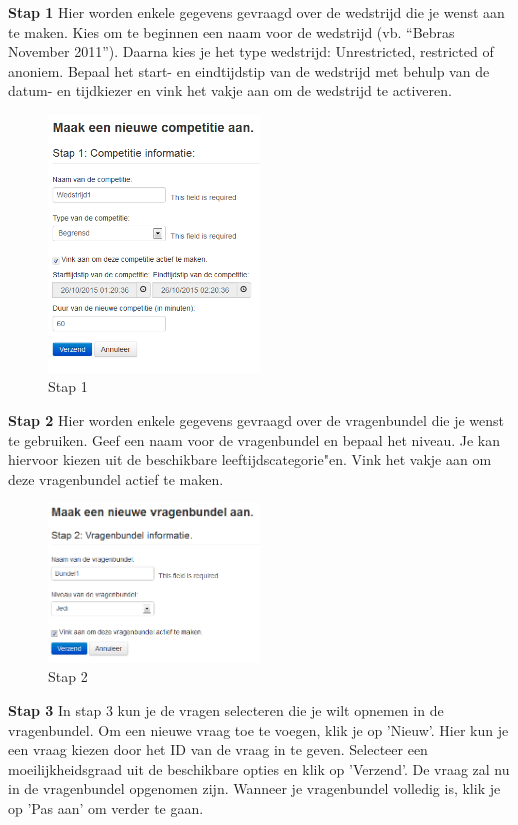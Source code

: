 \documentclass[]{article}
\begin{document}
\textbf{Stap 1}
Hier worden enkele gegevens gevraagd over de wedstrijd die je wenst aan te maken. 
Kies om te beginnen een naam voor de wedstrijd (vb. "`Bebras November 2011"'). Daarna kies je het type wedstrijd: Unrestricted, restricted of anoniem. Bepaal het start- en eindtijdstip van de wedstrijd met behulp van de datum- en tijdkiezer en vink het vakje aan om de wedstrijd te activeren.

\begin{figure}[!ht]
	\centering
	\includegraphics[width=0.5\textwidth]{img/stap1}
	\caption{Stap 1}
	\label{stap1}
\end{figure}

\textbf{Stap 2}
Hier worden enkele gegevens gevraagd over de vragenbundel die je wenst te gebruiken. 
Geef een naam voor de vragenbundel en bepaal het niveau. Je kan hiervoor kiezen uit de beschikbare leeftijdscategorie"en. Vink het vakje aan om deze vragenbundel actief te maken.

\begin{figure}[!ht]
	\centering
	\includegraphics[width=0.5\textwidth]{img/stap2}
	\caption{Stap 2}
	\label{stap2}
\end{figure}

\textbf{Stap 3}
In stap 3 kun je de vragen selecteren die je wilt opnemen in de vragenbundel. Om een nieuwe vraag toe te voegen, klik je op 'Nieuw'. Hier kun je een vraag kiezen door het ID van de vraag in te geven. Selecteer een moeilijkheidsgraad uit de beschikbare opties en klik op 'Verzend'. De vraag zal nu in de vragenbundel opgenomen zijn. Wanneer je vragenbundel volledig is, klik je op 'Pas aan' om verder te gaan.
\end{document}
